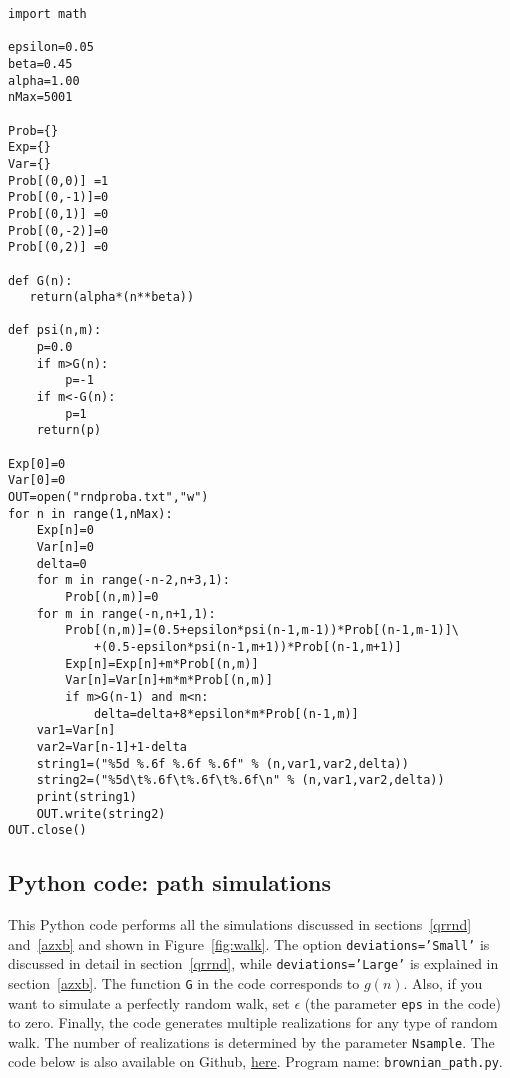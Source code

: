 \documentclass[oneside,10pt]{book}
\begin{document}
\begin{lstlisting}
import math

epsilon=0.05 
beta=0.45
alpha=1.00 
nMax=5001

Prob={}
Exp={}
Var={}
Prob[(0,0)] =1
Prob[(0,-1)]=0 
Prob[(0,1)] =0 
Prob[(0,-2)]=0 
Prob[(0,2)] =0 

def G(n):
   return(alpha*(n**beta))

def psi(n,m):
    p=0.0
    if m>G(n): 
        p=-1
    if m<-G(n):  
        p=1
    return(p)

Exp[0]=0
Var[0]=0
OUT=open("rndproba.txt","w")
for n in range(1,nMax):
    Exp[n]=0
    Var[n]=0
    delta=0
    for m in range(-n-2,n+3,1):
        Prob[(n,m)]=0
    for m in range(-n,n+1,1):
        Prob[(n,m)]=(0.5+epsilon*psi(n-1,m-1))*Prob[(n-1,m-1)]\
            +(0.5-epsilon*psi(n-1,m+1))*Prob[(n-1,m+1)]
        Exp[n]=Exp[n]+m*Prob[(n,m)]
        Var[n]=Var[n]+m*m*Prob[(n,m)]
        if m>G(n-1) and m<n: 
            delta=delta+8*epsilon*m*Prob[(n-1,m)]
    var1=Var[n]
    var2=Var[n-1]+1-delta
    string1=("%5d %.6f %.6f %.6f" % (n,var1,var2,delta))
    string2=("%5d\t%.6f\t%.6f\t%.6f\n" % (n,var1,var2,delta))
    print(string1)
    OUT.write(string2) 
OUT.close() 
\end{lstlisting}


\subsection{Python code: path simulations}\label{paths}

This Python code performs all the simulations discussed in sections~\ref{qrrnd} and~\ref{azxb} and shown in Figure~\ref{fig:walk}. The option
 \texttt{deviations='Small'} is discussed in detail in section~\ref{qrrnd}, while \texttt{deviations='Large'} is
 explained in section~\ref{azxb}. The function \texttt{G} in the code corresponds to $g(n)$. Also, if you want to simulate a perfectly random walk, set $\epsilon$ (the parameter \texttt{eps} in the code) to zero. Finally, the code generates multiple realizations for any type of random walk. The number of realizations is determined by the parameter \texttt{Nsample}.
The code below is also available on Github, \href{https://github.com/VincentGranville/Machine-Learning/blob/main/Source\%20Code/brownian_path.py}{here}. 
Program name: \texttt{brownian\_path.py}. \\
\end{document}
